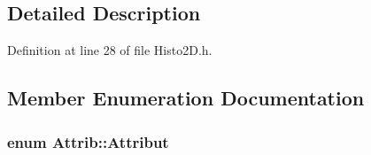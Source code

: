 \subsection{Detailed Description}


Definition at line 28 of file Histo2D.h.

\subsection{Member Enumeration Documentation}
\hypertarget{classAttrib_a69e171d7cc6417835a5a306d3c764235}{
\subsubsection[{Attribut}]{\setlength{\rightskip}{0pt plus 5cm}enum {\bf Attrib::Attribut}}}
\label{classAttrib_a69e171d7cc6417835a5a306d3c764235}
